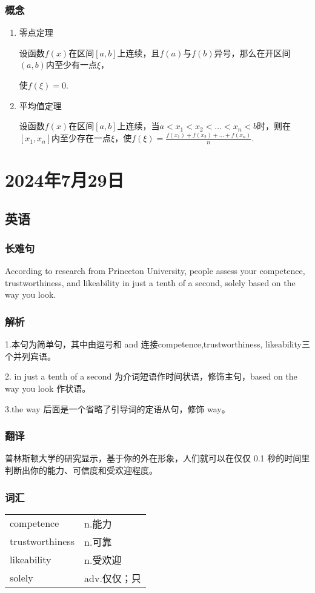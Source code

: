 \documentclass[UTF8]{ctexart}
\begin{document}
\subsubsection{概念}
\begin{enumerate}
      \item 零点定理

            设函数$f(x)$在区间$[a,b]$上连续，且$f(a)$与$f(b)$异号，那么在开区间$(a,b)$内至少有一点$\xi$，

            使$f(\xi)=0$.
      \item 平均值定理

            设函数$f(x)$在区间$[a,b]$上连续，当$a<x_1<x_2<...<x_n<b$时，则在$[x_1,x_n]$内至少存在一点$\xi$，使$f(\xi)=\frac{f(x_1)+f(x_2)+...+f(x_n)}{n}$.
\end{enumerate}
\section{2024年7月29日}
\subsection{英语}
\subsubsection{长难句}
According to research from Princeton University, people assess your competence, trustworthiness, and likeability in just a tenth of a second, solely based on the way you look.
\subsubsection{解析}
1.本句为简单句，其中由逗号和 and 连接competence,trustworthiness, likeability三个并列宾语。

2. in just a tenth of a second 为介词短语作时间状语，修饰主句，based on the way you look 作状语。

3.the way 后面是一个省略了引导词的定语从句，修饰 way。
\subsubsection{翻译}
普林斯顿大学的研究显示，基于你的外在形象，人们就可以在仅仅 0.1 秒的时间里判断出你的能力、可信度和受欢迎程度。
\subsubsection{词汇}
\begin{table}[h]
      \centering
      \begin{tabular}{p{}p{}}
            competence      & n.能力     \\
            trustworthiness & n.可靠     \\
            likeability     & n.受欢迎    \\
            solely          & adv.仅仅；只
      \end{tabular}
\end{table}
\end{document}
